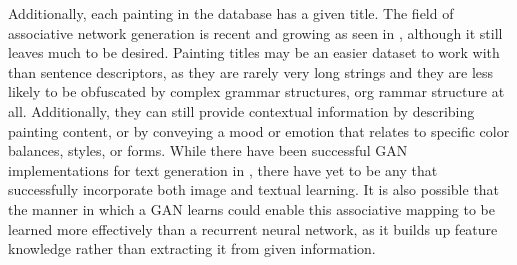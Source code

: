 \documentclass[10pt,twocolumn,letterpaper]{article}
\begin{document}
Additionally, each painting in the database has a given title. The field of associative network generation is recent and growing as seen in \cite{ishibashi2018associative}, although it still leaves much to be desired. Painting titles may be an easier dataset to work with than sentence descriptors, as they are rarely very long strings and they are less likely to be obfuscated by complex grammar structures, org rammar structure at all. Additionally, they can still provide contextual information by describing painting content, or by conveying a mood or emotion that relates to specific color balances, styles, or forms. While there have been successful GAN implementations for text generation in \cite{zhang2017adversarial}, there have yet to be any that successfully incorporate both image and textual learning. It is also possible that the manner in which a GAN learns could enable this associative mapping to be learned more effectively than a recurrent neural network, as it builds up feature knowledge rather than extracting it from given information.

{\small


}
\end{document}
